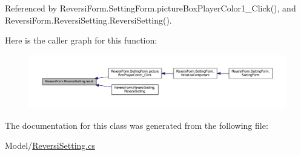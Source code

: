 Referenced by Reversi\+Form.\+Setting\+Form.\+picture\+Box\+Player\+Color1\+\_\+\+Click(), and Reversi\+Form.\+Reversi\+Setting.\+Reversi\+Setting().

Here is the caller graph for this function\+:\nopagebreak
\begin{figure}[H]
\begin{center}
\leavevmode
\includegraphics[width=350pt]{class_reversi_form_1_1_reversi_setting_a2334691b0fa7c13674742c97a50a2e04_icgraph}
\end{center}
\end{figure}


The documentation for this class was generated from the following file\+:\begin{DoxyCompactItemize}
\item 
Model/\hyperlink{_reversi_setting_8cs}{Reversi\+Setting.\+cs}\end{DoxyCompactItemize}
